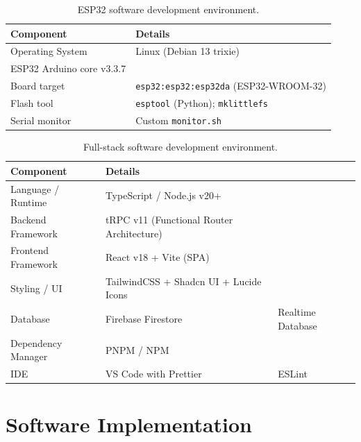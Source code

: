 \begin{table}[H]
	\centering
	\caption{ESP32 software development environment.}
	\label{tab:dev_env}
	\begin{tabularx}{\linewidth}{lX}
		\toprule
		\textbf{Component} & \textbf{Details}                               \\
		\midrule
		Operating System   & Linux (Debian 13 trixie)                       \\
		ESP32 Arduino core v3.3.7                                           \\
		Board target       & \texttt{esp32:esp32:esp32da} (ESP32-WROOM-32)  \\
		Flash tool         & \texttt{esptool} (Python); \texttt{mklittlefs} \\
		Serial monitor     & Custom \texttt{monitor.sh}                     \\
		\bottomrule
	\end{tabularx}
\end{table}

\begin{table}[H]
	\centering
	\caption{Full-stack software development environment.}
	\label{tab:backend_dev_env}
	\begin{tabularx}{\linewidth}{lX}
		\toprule
		\textbf{Component} & \textbf{Details}                               \\
		\midrule
		Language / Runtime & TypeScript / Node.js v20+                       \\
		Backend Framework  & tRPC v11 (Functional Router Architecture)      \\
		Frontend Framework & React v18 + Vite (SPA)                         \\
		Styling / UI       & TailwindCSS + Shadcn UI + Lucide Icons         \\
		Database           & Firebase Firestore & Realtime Database         \\
		Dependency Manager & PNPM / NPM                                     \\
		IDE                & VS Code with Prettier & ESLint                 \\
		\bottomrule
	\end{tabularx}
\end{table}

\section{Software Implementation}

